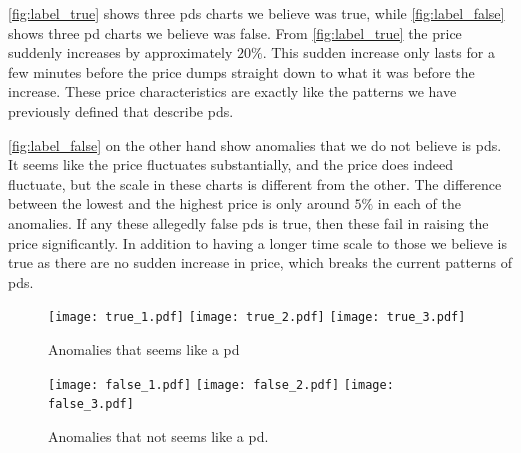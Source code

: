 \autoref{fig:label_true} shows three \acp{pd} charts we believe was true, while \autoref{fig:label_false} shows three \ac{pd} charts we believe was false. From \autoref{fig:label_true} the price suddenly increases by approximately $20\%$. This sudden increase only lasts for a few minutes before the price dumps straight down to what it was before the increase. These price characteristics are exactly like the patterns we have previously defined that describe \acp{pd}. 

\autoref{fig:label_false} on the other hand show anomalies that we do not believe is \acp{pd}. It seems like the price fluctuates substantially, and the price does indeed fluctuate, but the scale in these charts is different from the other. The difference between the lowest and the highest price is only around $5\%$ in each of the anomalies. If any these allegedly false \acp{pd} is true, then these fail in raising the price significantly. In addition to having a longer time scale to those we believe is true as there are no sudden increase in price, which breaks the current patterns of \acp{pd}.

\begin{figure}
    \centering
    \texttt{[image: true\_1.pdf]}
    \texttt{[image: true\_2.pdf]}
    \texttt{[image: true\_3.pdf]}
    \caption{Anomalies that seems like a \ac{pd}}
    \label{fig:label_true}
\end{figure}

\begin{figure}
    \centering
    \texttt{[image: false\_1.pdf]}
    \texttt{[image: false\_2.pdf]}
    \texttt{[image: false\_3.pdf]}
    \caption{Anomalies that not seems like a \ac{pd}.}
    \label{fig:label_false}
\end{figure}
\fi

